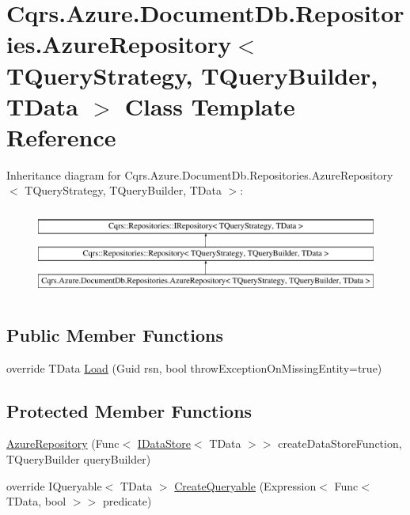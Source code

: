 \hypertarget{classCqrs_1_1Azure_1_1DocumentDb_1_1Repositories_1_1AzureRepository}{}\section{Cqrs.\+Azure.\+Document\+Db.\+Repositories.\+Azure\+Repository$<$ T\+Query\+Strategy, T\+Query\+Builder, T\+Data $>$ Class Template Reference}
\label{classCqrs_1_1Azure_1_1DocumentDb_1_1Repositories_1_1AzureRepository}
Inheritance diagram for Cqrs.\+Azure.\+Document\+Db.\+Repositories.\+Azure\+Repository$<$ T\+Query\+Strategy, T\+Query\+Builder, T\+Data $>$\+:\begin{figure}[H]
\begin{center}
\leavevmode
\includegraphics[height=2.901554cm]{classCqrs_1_1Azure_1_1DocumentDb_1_1Repositories_1_1AzureRepository}
\end{center}
\end{figure}
\subsection*{Public Member Functions}
\begin{DoxyCompactItemize}
\item 
override T\+Data \hyperlink{classCqrs_1_1Azure_1_1DocumentDb_1_1Repositories_1_1AzureRepository_a22c58163e101a6cb80f891bed6114380}{Load} (Guid rsn, bool throw\+Exception\+On\+Missing\+Entity=true)
\end{DoxyCompactItemize}
\subsection*{Protected Member Functions}
\begin{DoxyCompactItemize}
\item 
\hyperlink{classCqrs_1_1Azure_1_1DocumentDb_1_1Repositories_1_1AzureRepository_a0cd5703c46fde3eeefcb02b1d0113640}{Azure\+Repository} (Func$<$ \hyperlink{interfaceCqrs_1_1DataStores_1_1IDataStore}{I\+Data\+Store}$<$ T\+Data $>$$>$ create\+Data\+Store\+Function, T\+Query\+Builder query\+Builder)
\item 
override I\+Queryable$<$ T\+Data $>$ \hyperlink{classCqrs_1_1Azure_1_1DocumentDb_1_1Repositories_1_1AzureRepository_ac9ceeed80a02ced9a45b3443cd1f453f}{Create\+Queryable} (Expression$<$ Func$<$ T\+Data, bool $>$$>$ predicate)
\end{DoxyCompactItemize}
